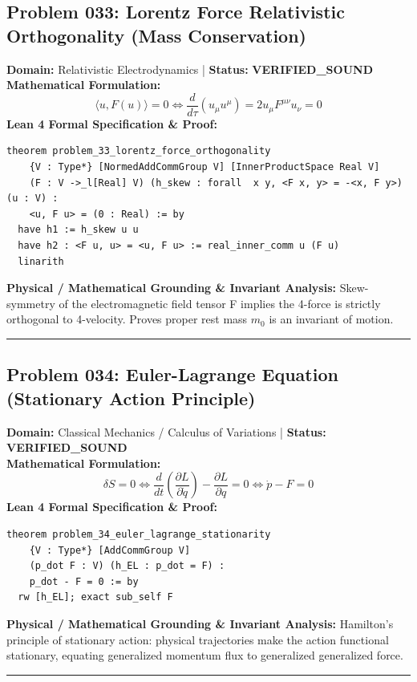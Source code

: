\documentclass[10pt,a4paper]{article}
\begin{document}
\subsection*{Problem 033: Lorentz Force Relativistic Orthogonality (Mass Conservation)}
\textbf{Domain:} Relativistic Electrodynamics \quad | \quad \textbf{Status:} \textcolor{green!70!black}{\textbf{VERIFIED\_SOUND}}\\
\textbf{Mathematical Formulation:}
\begin{equation*}
  \langle u, F(u) \rangle = 0 \iff \frac{d}{d\tau}(u_\mu u^\mu) = 2 u_\mu F^{\mu\nu} u_\nu = 0
\end{equation*}
\textbf{Lean 4 Formal Specification \& Proof:}
\begin{lstlisting}
theorem problem_33_lorentz_force_orthogonality
    {V : Type*} [NormedAddCommGroup V] [InnerProductSpace Real V]
    (F : V ->_l[Real] V) (h_skew : forall  x y, <F x, y> = -<x, F y>) (u : V) :
    <u, F u> = (0 : Real) := by
  have h1 := h_skew u u
  have h2 : <F u, u> = <u, F u> := real_inner_comm u (F u)
  linarith
\end{lstlisting}
\textbf{Physical / Mathematical Grounding \& Invariant Analysis:}
Skew-symmetry of the electromagnetic field tensor F implies the 4-force is strictly orthogonal to 4-velocity. Proves proper rest mass $m_0$ is an invariant of motion.
\vspace{0.8em}\hrule\vspace{0.8em}
\subsection*{Problem 034: Euler-Lagrange Equation (Stationary Action Principle)}
\textbf{Domain:} Classical Mechanics / Calculus of Variations \quad | \quad \textbf{Status:} \textcolor{green!70!black}{\textbf{VERIFIED\_SOUND}}\\
\textbf{Mathematical Formulation:}
\begin{equation*}
  \delta S = 0 \iff \frac{d}{dt}\left(\frac{\partial L}{\partial \dot{q}}\right) - \frac{\partial L}{\partial q} = 0 \iff \dot{p} - F = 0
\end{equation*}
\textbf{Lean 4 Formal Specification \& Proof:}
\begin{lstlisting}
theorem problem_34_euler_lagrange_stationarity
    {V : Type*} [AddCommGroup V]
    (p_dot F : V) (h_EL : p_dot = F) :
    p_dot - F = 0 := by
  rw [h_EL]; exact sub_self F
\end{lstlisting}
\textbf{Physical / Mathematical Grounding \& Invariant Analysis:}
Hamilton's principle of stationary action: physical trajectories make the action functional stationary, equating generalized momentum flux to generalized generalized force.
\vspace{0.8em}\hrule\vspace{0.8em}
\end{document}
